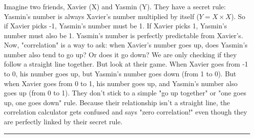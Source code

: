 \documentclass{article}
\begin{document}
\subsubsection*{}
\parbox{\textwidth}{
    Imagine two friends, Xavier (X) and Yasmin (Y). They have a secret rule: Yasmin's number is always Xavier's number multiplied by itself ($Y = X \times X$). So if Xavier picks -1, Yasmin's number must be 1. If Xavier picks 1, Yasmin's number must also be 1. Yasmin's number is perfectly predictable from Xavier's.
    \newline\newline
    Now, "correlation" is a way to ask: when Xavier's number goes up, does Yasmin's number also tend to go up? Or does it go down? We are only checking if they follow a straight line together.
    \newline\newline
    But look at their game. When Xavier goes from -1 to 0, his number goes up, but Yasmin's number goes down (from 1 to 0). But when Xavier goes from 0 to 1, his number goes up, and Yasmin's number also goes up (from 0 to 1). They don't stick to a simple "go up together" or "one goes up, one goes down" rule. Because their relationship isn't a straight line, the correlation calculator gets confused and says "zero correlation!" even though they are perfectly linked by their secret rule.
}

\noindent\rule{\textwidth}{0.4pt}\\
\end{document}
